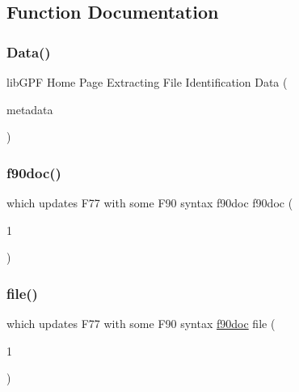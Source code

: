 \subsection{Function Documentation}
\mbox{\label{what__overview_81_8txt_a7483c2b9bbf430d46a9822c512d71bea}} 
\subsubsection{\texorpdfstring{Data()}{Data()}}
{\footnotesize\ttfamily lib\+G\+PF Home Page Extracting File Identification Data (\begin{DoxyParamCaption}\item[{metadata}]{ }\end{DoxyParamCaption})}

\mbox{\label{what__overview_81_8txt_aab2f56fdcdfab484c0d861985675a92f}} 
\subsubsection{\texorpdfstring{f90doc()}{f90doc()}}
{\footnotesize\ttfamily which updates F77 with some F90 syntax f90doc f90doc (\begin{DoxyParamCaption}\item[{1}]{ }\end{DoxyParamCaption})}

\mbox{\label{what__overview_81_8txt_a447b56c526e8da30e0dc94673727ee25}} 
\subsubsection{\texorpdfstring{file()}{file()}}
{\footnotesize\ttfamily which updates F77 with some F90 syntax \hyperlink{what__overview_81_8txt_aab2f56fdcdfab484c0d861985675a92f}{f90doc} file (\begin{DoxyParamCaption}\item[{1}]{ }\end{DoxyParamCaption})}

